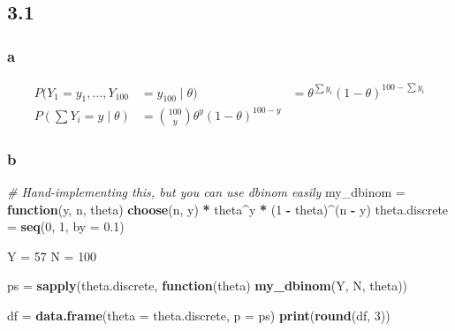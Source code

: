 \documentclass[]{article}
\newenvironment{Shaded}{\begin{snugshade}}{\end{snugshade}}
\newcommand{\CommentTok}[1]{\textcolor[rgb]{0.56,0.35,0.01}{\textit{#1}}}
\newcommand{\ControlFlowTok}[1]{\textcolor[rgb]{0.13,0.29,0.53}{\textbf{#1}}}
\newcommand{\DataTypeTok}[1]{\textcolor[rgb]{0.13,0.29,0.53}{#1}}
\newcommand{\DecValTok}[1]{\textcolor[rgb]{0.00,0.00,0.81}{#1}}
\newcommand{\FloatTok}[1]{\textcolor[rgb]{0.00,0.00,0.81}{#1}}
\newcommand{\KeywordTok}[1]{\textcolor[rgb]{0.13,0.29,0.53}{\textbf{#1}}}
\newcommand{\NormalTok}[1]{#1}
\newcommand{\OperatorTok}[1]{\textcolor[rgb]{0.81,0.36,0.00}{\textbf{#1}}}
\newcommand{\StringTok}[1]{\textcolor[rgb]{0.31,0.60,0.02}{#1}}
\begin{document}
\hypertarget{section}{%
\subsection{3.1}\label{section}}

\hypertarget{a}{%
\subsubsection{a}\label{a}}

\begin{align}
P(Y_1 = y_1, \dots, Y_{100} &= y_100 \mid \theta) &= \theta^{\sum y_i} (1 - \theta)^{100 - \sum y_i} \\
P(\sum Y_i = y \mid \theta) &= {100 \choose y} \theta^{y}(1 - \theta)^{100 - y}
\end{align}

\hypertarget{b}{%
\subsubsection{b}\label{b}}

\begin{Shaded}
\begin{Highlighting}[]
\CommentTok{# Hand-implementing this, but you can use dbinom easily}
\NormalTok{my_dbinom =}\StringTok{ }\ControlFlowTok{function}\NormalTok{(y, n, theta) }\KeywordTok{choose}\NormalTok{(n, y) }\OperatorTok{*}\StringTok{ }\NormalTok{theta}\OperatorTok{^}\NormalTok{y }\OperatorTok{*}\StringTok{ }\NormalTok{(}\DecValTok{1} \OperatorTok{-}\StringTok{ }\NormalTok{theta)}\OperatorTok{^}\NormalTok{(n }\OperatorTok{-}\StringTok{ }\NormalTok{y)}
\NormalTok{theta.discrete =}\StringTok{ }\KeywordTok{seq}\NormalTok{(}\DecValTok{0}\NormalTok{, }\DecValTok{1}\NormalTok{, }\DataTypeTok{by =} \FloatTok{0.1}\NormalTok{)}

\NormalTok{Y =}\StringTok{ }\DecValTok{57}
\NormalTok{N =}\StringTok{ }\DecValTok{100}

\NormalTok{ps =}\StringTok{ }\KeywordTok{sapply}\NormalTok{(theta.discrete, }\ControlFlowTok{function}\NormalTok{(theta) }\KeywordTok{my_dbinom}\NormalTok{(Y, N, theta))}

\NormalTok{df =}\StringTok{ }\KeywordTok{data.frame}\NormalTok{(}\DataTypeTok{theta =}\NormalTok{ theta.discrete, }\DataTypeTok{p =}\NormalTok{ ps)}
\KeywordTok{print}\NormalTok{(}\KeywordTok{round}\NormalTok{(df, }\DecValTok{3}\NormalTok{))}
\end{Highlighting}
\end{Shaded}
\end{document}
